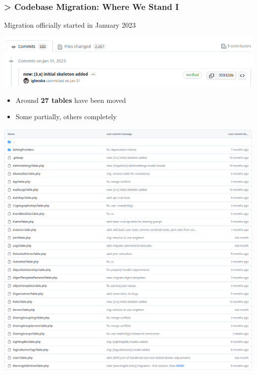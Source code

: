 \begin{frame}
    \frametitle{> Codebase Migration: Where We Stand I}
    Migration officially started in January 2023
    \begin{center}
        \includegraphics[width=1\linewidth]{pictures/status-2023-10-03.png}
    \end{center}
    \begin{minipage}{0.62\textwidth}
        \begin{itemize}
            \item Around \textbf{27 tables} have been moved
            \item Some partially, others completely
        \end{itemize}
    \end{minipage}%
    \begin{minipage}{0.33\textwidth}
        \;\includegraphics[width=1.2\linewidth]{pictures/migrated-models.png}
    \end{minipage}
    
\end{frame}

